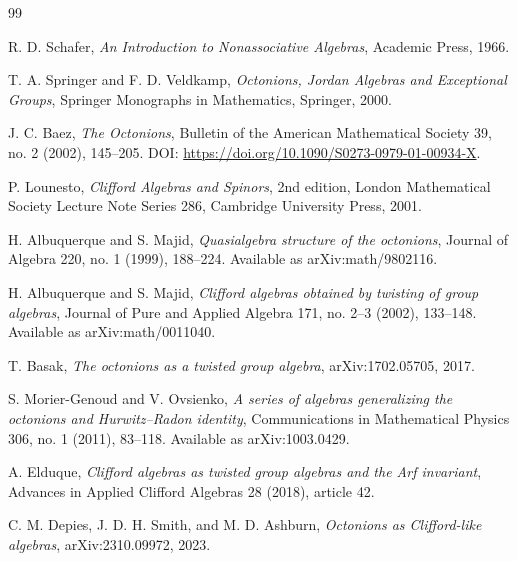 \documentclass[11pt]{article}
\begin{document}
\begin{thebibliography}{99}

R. D. Schafer,
\emph{An Introduction to Nonassociative Algebras},
Academic Press, 1966.

T. A. Springer and F. D. Veldkamp,
\emph{Octonions, Jordan Algebras and Exceptional Groups},
Springer Monographs in Mathematics, Springer, 2000.

J. C. Baez,
\emph{The Octonions},
Bulletin of the American Mathematical Society 39, no. 2 (2002), 145--205.
DOI: \url{https://doi.org/10.1090/S0273-0979-01-00934-X}.

P. Lounesto,
\emph{Clifford Algebras and Spinors},
2nd edition, London Mathematical Society Lecture Note Series 286,
Cambridge University Press, 2001.

H. Albuquerque and S. Majid,
\emph{Quasialgebra structure of the octonions},
Journal of Algebra 220, no. 1 (1999), 188--224.
Available as arXiv:math/9802116.

H. Albuquerque and S. Majid,
\emph{Clifford algebras obtained by twisting of group algebras},
Journal of Pure and Applied Algebra 171, no. 2--3 (2002), 133--148.
Available as arXiv:math/0011040.

T. Basak,
\emph{The octonions as a twisted group algebra},
arXiv:1702.05705, 2017.

S. Morier-Genoud and V. Ovsienko,
\emph{A series of algebras generalizing the octonions and Hurwitz--Radon identity},
Communications in Mathematical Physics 306, no. 1 (2011), 83--118.
Available as arXiv:1003.0429.

A. Elduque,
\emph{Clifford algebras as twisted group algebras and the Arf invariant},
Advances in Applied Clifford Algebras 28 (2018), article 42.

C. M. Depies, J. D. H. Smith, and M. D. Ashburn,
\emph{Octonions as Clifford-like algebras},
arXiv:2310.09972, 2023.

\end{thebibliography}
\end{document}

